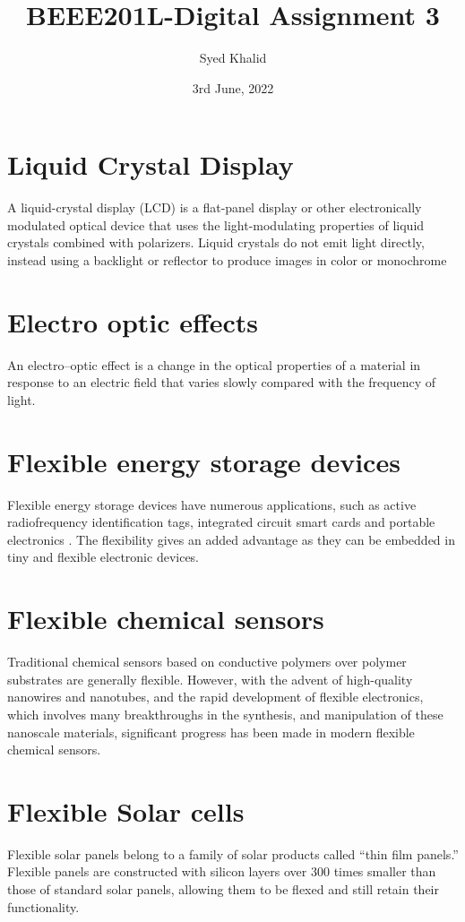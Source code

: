 \documentclass[14pt]{article}
\title{\textbf{BEEE201L-Digital Assignment 3}}
\author{Syed Khalid}
\date{3rd June, 2022}
\begin{document}
\maketitle

\section{Liquid Crystal Display}%
  \label{sec:Liquid Crystal Display}
  \Large
 A liquid-crystal display (LCD) is a flat-panel display or other electronically modulated optical device that uses the light-modulating properties of liquid crystals combined with polarizers. Liquid crystals do not emit light directly, instead using a backlight or reflector to produce images in color or monochrome
 \section{Electro optic effects}%
   \label{sec:Electro optic effects}
   An electro–optic effect is a change in the optical properties of a material in response to an electric field that varies slowly compared with the frequency of light. 
   \section{Flexible energy storage devices}%
     \label{sec:Flexible energy storage devices}
Flexible energy storage devices have numerous applications, such as active radiofrequency identification tags, integrated circuit smart cards and portable electronics . The flexibility gives an added advantage as they can be embedded in tiny and flexible electronic devices.
     \section{Flexible chemical sensors}%
       \label{sec:Flexible chemical sensors}
       Traditional chemical sensors based on conductive polymers over polymer substrates are generally flexible. However, with the advent of high-quality nanowires and nanotubes, and the rapid development of flexible electronics, which involves many breakthroughs in the synthesis, and manipulation of these nanoscale materials, significant progress has been made in modern flexible chemical sensors.
       \section{Flexible Solar cells}%
         \label{sec:Flexible Solar cells}
        Flexible solar panels belong to a family of solar products called “thin film panels.” Flexible panels are constructed with silicon layers over 300 times smaller than those of standard solar panels, allowing them to be flexed and still retain their functionality. 
\end{document}
